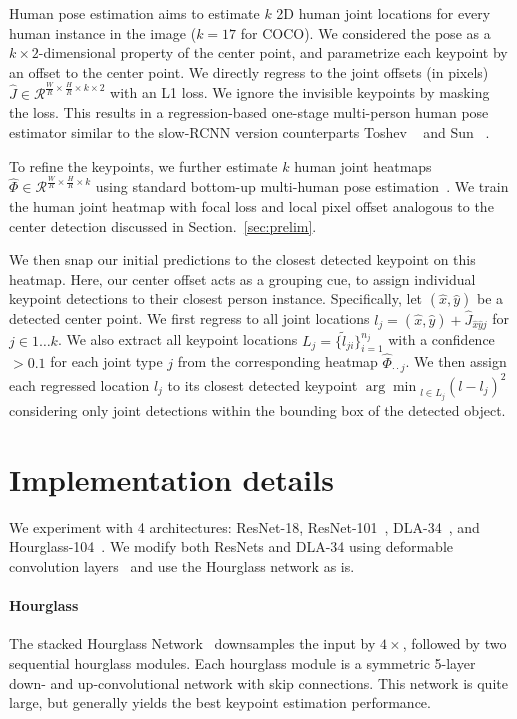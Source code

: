 \documentclass[10pt,twocolumn,letterpaper]{article}
\begin{document}
Human pose estimation aims to estimate $k$ 2D human joint locations for every human instance in the image ($k = 17$ for COCO).
We considered the pose as a $k \times 2$-dimensional property of the center point, and parametrize each keypoint by an offset to the center point.
We directly regress to the joint offsets (in pixels) $\hat J \in \mathcal{R}^{\frac{W}{R} \times \frac{H}{R} \times k \times 2}$ with an L1 loss.
We ignore the invisible keypoints by masking the loss.
This results in a regression-based one-stage multi-person human pose estimator similar to the slow-RCNN version counterparts Toshev \etal~\cite{toshev2014deeppose} and Sun \etal~\cite{sun2017compositional}.

To refine the keypoints, we further estimate $k$ human joint heatmaps $\hat \Phi \in \mathcal{R}^{\frac{W}{R} \times \frac{H}{R} \times k}$ using standard bottom-up multi-human pose estimation~\cite{cao2017realtime,newell2017associative,papandreou2018personlab}.
We train the human joint heatmap with focal loss and local pixel offset analogous to the center detection discussed in Section.~\ref{sec:prelim}.

We then snap our initial predictions to the closest detected keypoint on this heatmap.
Here, our center offset acts as a grouping cue, to assign individual keypoint detections to their closest person instance. 
Specifically, let $(\hat x,\hat y)$ be a detected center point.
We first regress to all joint locations $l_j = (\hat x,\hat y) + \hat J_{\hat x\hat yj}$ for $j \in 1 \ldots k$.
We also extract all keypoint locations $L_j = \{\tilde l_{ji}\}_{i=1}^{n_j}$ with a confidence $>0.1$ for each joint type $j$ from the corresponding heatmap $\hat \Phi_{\cdot\cdot j}$.
We then assign each regressed location $l_j$ to its closest detected keypoint ${\arg\min}_{l \in L_j} (l - l_j)^2$ considering only joint detections within the bounding box of the detected object.


\section{Implementation details}

We experiment with 4 architectures: ResNet-18, ResNet-101~\cite{xiao2018simple}, DLA-34~\cite{yu2018deep}, and Hourglass-104~\cite{Law_2018_ECCV}.
We modify both ResNets and DLA-34 using deformable convolution layers~\cite{Dai_2017_ICCV} and use the Hourglass network as is.

\label{sec:networks}
\paragraph{Hourglass}
The stacked Hourglass Network~\cite{newell2016stacked,Law_2018_ECCV} downsamples the input by $4\times$,  followed by two sequential hourglass modules.
Each hourglass module is a symmetric 5-layer down- and up-convolutional network with skip connections.
This network is quite large, but generally yields the best keypoint estimation performance.
\end{document}
